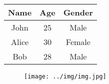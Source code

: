 \documentclass{article}
\begin{document}
    
\begin{table}[h!]
\centering
\begin{tabular}{|c|c|c|}
\hline
Name & Age & Gender \\
\hline
John & 25 & Male \\
\hline
Alice & 30 & Female \\
\hline
Bob & 28 & Male \\
\hline
\end{tabular}
\end{table}

\begin{figure}[h!]
\centering
\texttt{[image: ../img/img.jpg]}
\end{figure}
    
\end{document}

